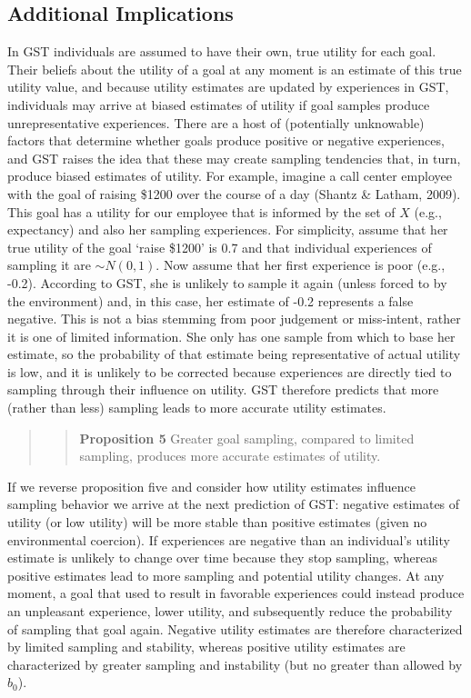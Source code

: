 \documentclass[english,,man]{apa6}
\theoremstyle{definition}
\theoremstyle{definition}
\theoremstyle{definition}
\theoremstyle{remark}
\begin{document}
\hypertarget{additional-implications}{%
\subsection{Additional Implications}\label{additional-implications}}

In GST individuals are assumed to have their own, true utility for each
goal. Their beliefs about the utility of a goal at any moment is an
estimate of this true utility value, and because utility estimates are
updated by experiences in GST, individuals may arrive at biased
estimates of utility if goal samples produce unrepresentative
experiences. There are a host of (potentially unknowable) factors that
determine whether goals produce positive or negative experiences, and
GST raises the idea that these may create sampling tendencies that, in
turn, produce biased estimates of utility. For example, imagine a call
center employee with the goal of raising \$1200 over the course of a day
(Shantz \& Latham, 2009). This goal has a utility for our employee that
is informed by the set of \(X\) (e.g., expectancy) and also her sampling
experiences. For simplicity, assume that her true utility of the goal
`raise \$1200' is 0.7 and that individual experiences of sampling it are
\(\sim {N}(0,1)\). Now assume that her first experience is poor (e.g.,
-0.2). According to GST, she is unlikely to sample it again (unless
forced to by the environment) and, in this case, her estimate of -0.2
represents a false negative. This is not a bias stemming from poor
judgement or miss-intent, rather it is one of limited information. She
only has one sample from which to base her estimate, so the probability
of that estimate being representative of actual utility is low, and it
is unlikely to be corrected because experiences are directly tied to
sampling through their influence on utility. GST therefore predicts that
more (rather than less) sampling leads to more accurate utility
estimates.

\begin{quote}
\begin{quote}
\textbf{Proposition 5} Greater goal sampling, compared to limited
sampling, produces more accurate estimates of utility.
\end{quote}
\end{quote}

If we reverse proposition five and consider how utility estimates
influence sampling behavior we arrive at the next prediction of GST:
negative estimates of utility (or low utility) will be more stable than
positive estimates (given no environmental coercion). If experiences are
negative than an individual's utility estimate is unlikely to change
over time because they stop sampling, whereas positive estimates lead to
more sampling and potential utility changes. At any moment, a goal that
used to result in favorable experiences could instead produce an
unpleasant experience, lower utility, and subsequently reduce the
probability of sampling that goal again. Negative utility estimates are
therefore characterized by limited sampling and stability, whereas
positive utility estimates are characterized by greater sampling and
instability (but no greater than allowed by \(b_0\)).
\end{document}
